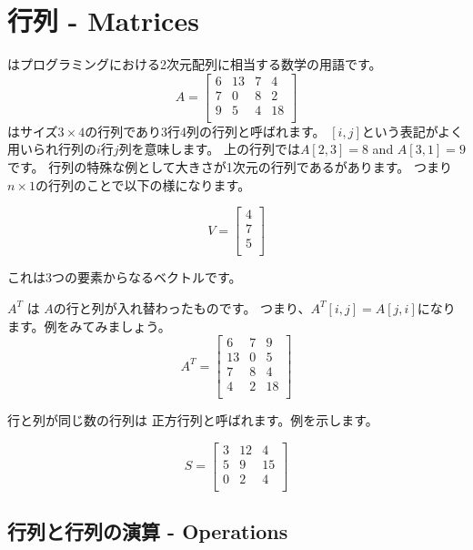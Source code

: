 \chapter{行列 - Matrices}


はプログラミングにおける2次元配列に相当する数学の用語です。
\[
A =
 \begin{bmatrix}
  6 & 13 & 7 & 4 \\
  7 & 0 & 8 & 2 \\
  9 & 5 & 4 & 18 \\
 \end{bmatrix}
\]
はサイズ$3 \times 4$の行列であり3行4列の行列と呼ばれます。
$[i, j]$という表記がよく用いられ行列の$i$行$j$列を意味します。
上の行列では$A[2,3]=8$ and $A[3,1]=9$です。
行列の特殊な例として大きさが1次元の行列であるがあります。
つまり$n \times 1$の行列のことで以下の様になります。

\[
V =
\begin{bmatrix}
4 \\
7 \\
5 \\
\end{bmatrix}
\]

これは3つの要素からなるベクトルです。


 $A^T$ は $A$の行と列が入れ替わったものです。
つまり、$A^T[i,j]=A[j,i]$になります。例をみてみましょう。
\[
A^T =
 \begin{bmatrix}
  6 & 7 & 9 \\
  13 & 0 & 5 \\
  7 & 8 & 4 \\
  4 & 2 & 18 \\
 \end{bmatrix}
\]


行と列が同じ数の行列は
正方行列と呼ばれます。例を示します。

\[
S =
 \begin{bmatrix}
  3 & 12 & 4  \\
  5 & 9 & 15  \\
  0 & 2 & 4 \\
 \end{bmatrix}
\]

\section{行列と行列の演算 - Operations}

